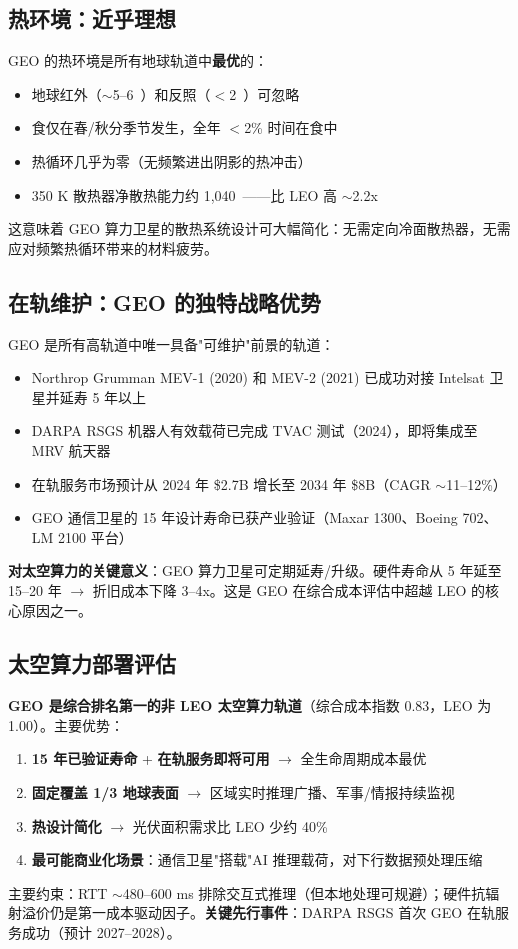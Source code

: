 \subsection{热环境：近乎理想}

GEO 的热环境是所有地球轨道中\textbf{最优}的：
\begin{itemize}
    \item 地球红外（$\sim$5--6~\wpm）和反照（$<$2~\wpm）可忽略
    \item 食仅在春/秋分季节发生，全年 $<$2\% 时间在食中
    \item 热循环几乎为零（无频繁进出阴影的热冲击）
    \item 350 K 散热器净散热能力约 1,040~\wpm——比 LEO 高 $\sim$2.2x
\end{itemize}

这意味着 GEO 算力卫星的散热系统设计可大幅简化：无需定向冷面散热器，无需应对频繁热循环带来的材料疲劳。

\subsection{在轨维护：GEO 的独特战略优势}

GEO 是所有高轨道中唯一具备"可维护"前景的轨道：

\begin{itemize}
    \item Northrop Grumman MEV-1 (2020) 和 MEV-2 (2021) 已成功对接 Intelsat 卫星并延寿 5 年以上
    \item DARPA RSGS 机器人有效载荷已完成 TVAC 测试（2024），即将集成至 MRV 航天器
    \item 在轨服务市场预计从 2024 年 \$2.7B 增长至 2034 年 \$8B（CAGR $\sim$11--12\%）
    \item GEO 通信卫星的 15 年设计寿命已获产业验证（Maxar 1300、Boeing 702、LM 2100 平台）
\end{itemize}

\textbf{对太空算力的关键意义}：GEO 算力卫星可定期延寿/升级。硬件寿命从 5 年延至 15--20 年 $\rightarrow$ 折旧成本下降 3--4x。这是 GEO 在综合成本评估中超越 LEO 的核心原因之一。

\subsection{太空算力部署评估}

\textbf{GEO 是综合排名第一的非 LEO 太空算力轨道}（综合成本指数 0.83，LEO 为 1.00）。主要优势：

\begin{enumerate}
    \item \textbf{15 年已验证寿命} + \textbf{在轨服务即将可用} $\rightarrow$ 全生命周期成本最优
    \item \textbf{固定覆盖 1/3 地球表面} $\rightarrow$ 区域实时推理广播、军事/情报持续监视
    \item \textbf{热设计简化} $\rightarrow$ 光伏面积需求比 LEO 少约 40\%
    \item \textbf{最可能商业化场景}：通信卫星"搭载"AI 推理载荷，对下行数据预处理压缩
\end{enumerate}

主要约束：RTT $\sim$480--600 ms 排除交互式推理（但本地处理可规避）；硬件抗辐射溢价仍是第一成本驱动因子。\textbf{关键先行事件}：DARPA RSGS 首次 GEO 在轨服务成功（预计 2027--2028）。

